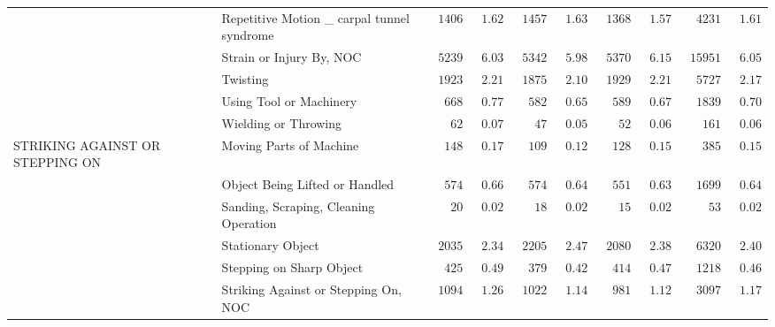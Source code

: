 \documentclass[9pt, oneside]{article}   	%
\begin{document}
\begin{longtable}{p{1.8in}p{2.2in}cccccccc}
 & Repetitive Motion \_ carpal tunnel syndrome  & $\phantom{0}1406$ & $\phantom{0}1.62$ & $\phantom{0}1457$ & $\phantom{0}1.63$ & $\phantom{0}1368$ & $\phantom{0}1.57$ & $\phantom{00}4231$ & $\phantom{0}1.61$ \\
 & Strain or Injury By, NOC  & $\phantom{0}5239$ & $\phantom{0}6.03$ & $\phantom{0}5342$ & $\phantom{0}5.98$ & $\phantom{0}5370$ & $\phantom{0}6.15$ & $\phantom{0}15951$ & $\phantom{0}6.05$ \\
 & Twisting  & $\phantom{0}1923$ & $\phantom{0}2.21$ & $\phantom{0}1875$ & $\phantom{0}2.10$ & $\phantom{0}1929$ & $\phantom{0}2.21$ & $\phantom{00}5727$ & $\phantom{0}2.17$ \\
 & Using Tool or Machinery  & $\phantom{00}668$ & $\phantom{0}0.77$ & $\phantom{00}582$ & $\phantom{0}0.65$ & $\phantom{00}589$ & $\phantom{0}0.67$ & $\phantom{00}1839$ & $\phantom{0}0.70$ \\
 & Wielding or Throwing  & $\phantom{000}62$ & $\phantom{0}0.07$ & $\phantom{000}47$ & $\phantom{0}0.05$ & $\phantom{000}52$ & $\phantom{0}0.06$ & $\phantom{000}161$ & $\phantom{0}0.06$ \\
STRIKING AGAINST OR STEPPING ON & Moving Parts of Machine  & $\phantom{00}148$ & $\phantom{0}0.17$ & $\phantom{00}109$ & $\phantom{0}0.12$ & $\phantom{00}128$ & $\phantom{0}0.15$ & $\phantom{000}385$ & $\phantom{0}0.15$ \\
 & Object Being Lifted or Handled  & $\phantom{00}574$ & $\phantom{0}0.66$ & $\phantom{00}574$ & $\phantom{0}0.64$ & $\phantom{00}551$ & $\phantom{0}0.63$ & $\phantom{00}1699$ & $\phantom{0}0.64$ \\
 & Sanding, Scraping, Cleaning Operation  & $\phantom{000}20$ & $\phantom{0}0.02$ & $\phantom{000}18$ & $\phantom{0}0.02$ & $\phantom{000}15$ & $\phantom{0}0.02$ & $\phantom{0000}53$ & $\phantom{0}0.02$ \\
 & Stationary Object  & $\phantom{0}2035$ & $\phantom{0}2.34$ & $\phantom{0}2205$ & $\phantom{0}2.47$ & $\phantom{0}2080$ & $\phantom{0}2.38$ & $\phantom{00}6320$ & $\phantom{0}2.40$ \\
 & Stepping on Sharp Object  & $\phantom{00}425$ & $\phantom{0}0.49$ & $\phantom{00}379$ & $\phantom{0}0.42$ & $\phantom{00}414$ & $\phantom{0}0.47$ & $\phantom{00}1218$ & $\phantom{0}0.46$ \\
 & Striking Against or Stepping On, NOC  & $\phantom{0}1094$ & $\phantom{0}1.26$ & $\phantom{0}1022$ & $\phantom{0}1.14$ & $\phantom{00}981$ & $\phantom{0}1.12$ & $\phantom{00}3097$ & $\phantom{0}1.17$ \\

\end{longtable}
\end{document}
